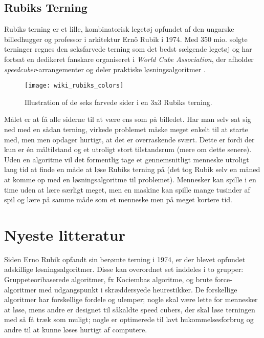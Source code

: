 \documentclass[../main.tex]{subfiles}
\begin{document}
\subsection{Rubiks Terning}

Rubiks terning er et lille, kombinatorisk legetøj opfundet af den ungarske billedhugger og professor i arkitektur Ernö Rubik i 1974. Med 350 mio. solgte terninger regnes den seksfarvede terning som det bedst sælgende legetøj og har fortsat en dedikeret fanskare organiseret i \textit{World Cube Association}, der afholder \textit{speedcuber}-arrangementer og deler praktiske løsningsalgoritmer \cite{RubiksWiki}. 
\begin{figure}[H]
	\centering 
	\texttt{[image: wiki\_rubiks\_colors]}
	\caption{Illustration of de seks farvede sider i en 3x3 Rubiks terning.\protect\footnotemark}
\end{figure}
Målet er at få alle siderne til at være ens som på billedet. 
Har man selv sat sig ned med en sådan terning, virkede problemet måske meget enkelt til at starte med, men men opdager hurtigt, at det er overraskende svært.
Dette er fordi der kun er én måltilstand og et utroligt stort tilstandsrum (mere om dette senere).
Uden en algoritme vil det formentlig tage et gennemsnitligt menneske utroligt lang tid at finde en måde at løse Rubiks terning på (det tog Rubik selv en måned at komme op med en løsningsalgoritme til problemet). 
Mennesker kan spille i en time uden at lære særligt meget, men en maskine kan spille mange tusinder af spil og lære på samme måde som et menneske men på meget kortere tid. 



\section{Nyeste litteratur}
\cite{RubiksMedium}
Siden Erno Rubik opfandt sin berømte terning i 1974, er der blevet opfundet adskillige løsningsalgoritmer.
Disse kan overordnet set inddeles i to grupper:
Gruppeteoribaserede algoritmer, fx Kociembas algoritme, og brute force-algoritmer med udgangspunkt i skræddersyede heurestikker.
De forskellige algoritmer har forskellige fordele og ulemper;
nogle skal være lette for mennesker at løse, mens andre er designet til såkaldte speed cubers, der skal løse terningen med så få træk som muligt;
nogle er optimerede til lavt hukommelsesforbrug og andre til at kunne løses hurtigt af computere. 
\end{document}
